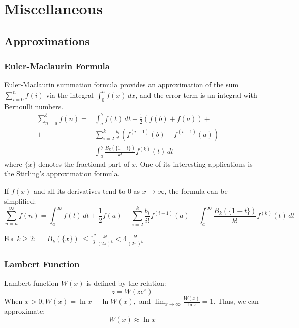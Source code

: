\chapter{Miscellaneous}

\section{Approximations}

\subsection{Euler-Maclaurin Formula}

Euler-Maclaurin summation formula provides an approximation of the sum $\sum_{i=0}^n{f(i)}$
via the integral $\int_0^n{f(x)\,dx}$, and the error term is an integral with Bernoulli numbers.
\begin{equation}
    \label{eq:euler-maclaurin-formula}
    \begin{split}
        \sum_{n=a}^b{f(n)}=&\int_a^b{f(t)\,dt}+\frac{1}{2}(f(b)+f(a))+\\
        +&\sum_{i=2}^k{\frac{b_i}{i!}\left(f^{(i-1)}(b)-f^{(i-1)}(a)\right)}-\\
        -&\int_a^b{\frac{B_k(\{1-t\})}{k!}f^{(k)}(t)\,dt}
    \end{split}
\end{equation}
where $\{x\}$ denotes the fractional part of $x$.
One of its interesting applications is the Stirling's approximation formula.

If $f(x)$ and all its derivatives tend to $0$ as $x\to\infty$, the formula can be simplified:
\begin{equation}
    \sum_{n=a}^\infty{f(n)}=\int_a^\infty{f(t)\,dt}+\frac{1}{2}f(a)
    -\sum_{i=2}^k{\frac{b_i}{i!}f^{(i-1)}(a)}
    -\int_a^\infty{\frac{B_k(\{1-t\})}{k!}f^{(k)}(t)\,dt}
\end{equation}

For $k\geq2$: $\quad|B_k(\{x\})|\leq\frac{\pi^2}{3}\frac{k!}{(2\pi)^k}<4\frac{k!}{(2\pi)^k}$

\subsection{Lambert Function}

Lambert function $W(x)$ is defined by the relation:
\begin{equation}
    z=W(ze^z)
\end{equation}
When $x>0, W(x)=\ln x-\ln W(x),$ and $\lim_{x\to\infty}{\frac{W(x)}{\ln x}}=1$.
Thus, we can approximate:
\begin{equation}
    \label{eq:lambert-approx}
    W(x)\approx\ln x
\end{equation}

